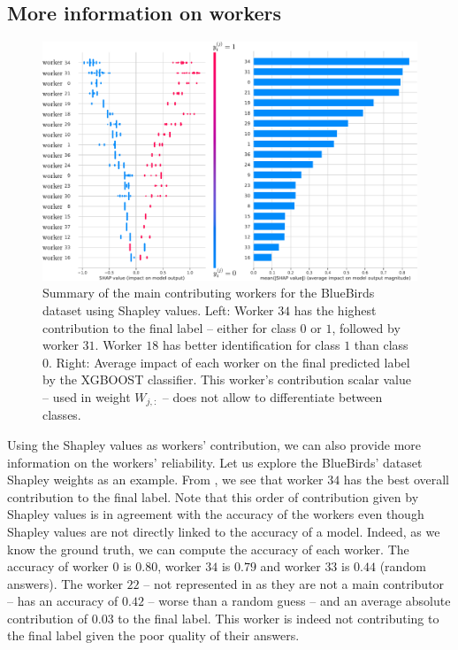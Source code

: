 \documentclass{cap2024}
\begin{document}
\subsection{More information on workers}

\begin{figure}[htb]
  \centering
  \includegraphics[width=.9\textwidth]{./../summary_plot_shap_all_bluebirds.pdf}
  \caption{Summary of the main contributing workers for the BlueBirds dataset using Shapley values. Left: Worker $34$ has the highest contribution to the final label -- either for class $0$ or $1$, followed by worker $31$. Worker $18$ has better identification for class $1$ than class $0$. Right: Average impact of each worker on the final predicted label by the XGBOOST classifier. This worker's contribution scalar value -- used in  weight $W_{j,:}$ -- does not allow to differentiate between classes.}
  \label{fig:shap_bluebirds}
\end{figure}

Using the Shapley values as workers' contribution, we can also provide more information on the workers' reliability.
Let us explore the BlueBirds' dataset Shapley weights as an example.
From , we see that worker $34$ has the best overall contribution to the final label.
Note that this order of contribution given by Shapley values is in agreement with the accuracy of the workers even though Shapley values are not directly linked to the accuracy of a model.
Indeed, as we know the ground truth, we can compute the accuracy of each worker.
The accuracy of worker $0$ is $0.80$, worker $34$ is $0.79$ and worker $33$ is $0.44$ (random answers).
The worker $22$ -- not represented in  as they are not a main contributor -- has an accuracy of $0.42$ -- worse than a random guess -- and an average absolute contribution of $0.03$ to the final label. This worker is indeed not contributing to the final label given the poor quality of their answers.
\end{document}
